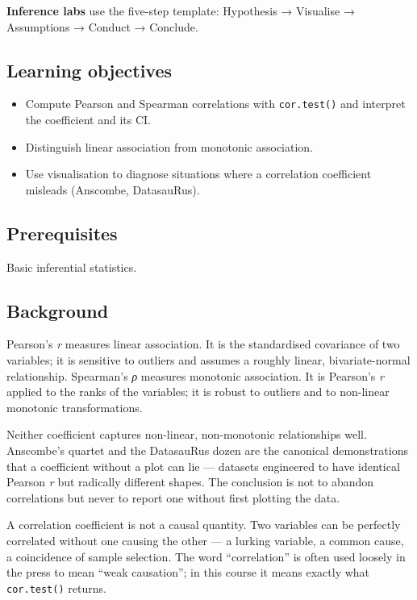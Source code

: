 \documentclass[
]{article}
\author{}
\date{\vspace{-2.5em}}
\providecommand{\tightlist}{%
  \setlength{\itemsep}{0pt}\setlength{\parskip}{0pt}}
\begin{document}
\textbf{Inference labs} use the five-step template: Hypothesis →
Visualise → Assumptions → Conduct → Conclude.

\subsection{Learning objectives}\label{learning-objectives}

\begin{itemize}
\tightlist
\item
  Compute Pearson and Spearman correlations with \texttt{cor.test()} and
  interpret the coefficient and its CI.
\item
  Distinguish linear association from monotonic association.
\item
  Use visualisation to diagnose situations where a correlation
  coefficient misleads (Anscombe, DatasauRus).
\end{itemize}

\subsection{Prerequisites}\label{prerequisites}

Basic inferential statistics.

\subsection{Background}\label{background}

Pearson's \emph{r} measures linear association. It is the standardised
covariance of two variables; it is sensitive to outliers and assumes a
roughly linear, bivariate-normal relationship. Spearman's \emph{ρ}
measures monotonic association. It is Pearson's \emph{r} applied to the
ranks of the variables; it is robust to outliers and to non-linear
monotonic transformations.

Neither coefficient captures non-linear, non-monotonic relationships
well. Anscombe's quartet and the DatasauRus dozen are the canonical
demonstrations that a coefficient without a plot can lie --- datasets
engineered to have identical Pearson \emph{r} but radically different
shapes. The conclusion is not to abandon correlations but never to
report one without first plotting the data.

A correlation coefficient is not a causal quantity. Two variables can be
perfectly correlated without one causing the other --- a lurking
variable, a common cause, a coincidence of sample selection. The word
``correlation'' is often used loosely in the press to mean ``weak
causation''; in this course it means exactly what \texttt{cor.test()}
returns.
\end{document}
